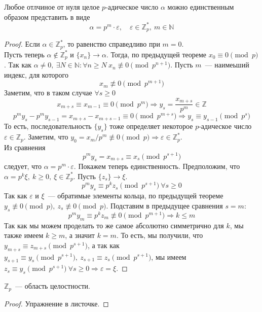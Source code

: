 \documentclass[11pt]{article}
\begin{document}
    \begin{theorem}\label{predstp-adic}
        Любое отлчиное от нуля целое $p$-адическое число $\alpha$ можно единственным образом представить в виде
        \[ \alpha = p^m \cdot \varepsilon, \quad \varepsilon \in \mathbb{Z}_p^{*}, \ m \in \mathbb{N} \]

    \end{theorem}
    \begin{proof}
        Если $\alpha \in \mathbb{Z}_p^{*}$, то равенство справедливо при $m = 0$.\\
        Пусть теперь $\alpha \notin \mathbb{Z}_p^{*}$ и $\{ x_n \} \to \alpha$. Тогда, по предыдущей теореме
        $x_0 \equiv 0 \pmod{p}$. Так как $\alpha \neq 0, \ \exists N \in \mathbb{N}\colon \forall n \ge N \ x_n \not\equiv 0 \pmod{p^{n + 1}}$.
        Пусть $m$~--- наимеьший индекс, для которого
        \[ x_m \not\equiv 0 \pmod{p^{m + 1}}\]
        Заметим, что в таком случае $\forall s \ge 0$
        \[ x_{m + s} \equiv x_{m - 1} \equiv 0 \pmod{p^{m}} \Rightarrow y_s = \frac{x_{m + s}}{p^m} \in \mathbb{Z} \]
        \[ p^m y_s - p^m y_{s - 1}  = x_{m + s} - x_{m + s - 1} \equiv 0 \pmod{p^{m + s}} \Rightarrow y_s \equiv y_{s - 1} \pmod{p^s}\]
        То есть, последовательность $\{ y_s \}$ тоже определяет некоторое $p$-адическое число $\varepsilon \in \mathbb{Z}_p$.
        Заметим, что $y_0 = x_m/p^m \not\equiv 0 \pmod{p} \Rightarrow \varepsilon \in \mathbb{Z}_p^{*}$.\\
        Из сравнения
        \[ p^m y_s = x_{m + s} \equiv x_s \pmod{p^{s + 1}} \]
        следует, что $\alpha = p^m \cdot \varepsilon$.
        Покажем теперь единственность. Предположим, что $\alpha = p^k \xi, \ k \ge 0, \ \xi \in \mathbb{Z}_{p}^{*}$. Пусть $\{ z_s \} \to \xi$.
        \[ p^m y_s \equiv p^k z_s \pmod{p^{s + 1}} \ \forall s \ge 0 \]
        Так как $\varepsilon$ и $\xi$~--- обратимые элементы кольца, по предыдущей теореме $y_s \not\equiv 0 \pmod{p}, \ z_s \not\equiv 0 \pmod{p}$.
        Подставим в предыдущее сравнения $s = m$:
        \[ p^m y_m \equiv p^k z_m \not\equiv 0 \pmod{p^{m + 1}} \Rightarrow k \le m \]
        Так как мы можем проделать то же самое абсолютно симметрично для $k$, мы также имеем $k \ge m$, а значит
        $k = m$.
        То есть, мы получили, что $y_{m + s} \equiv z_{m + s} \pmod{p^{s + 1}}$, а так как $y_{s + 1} \equiv y_s \pmod{p^{s + 1}}, \ z_{s + 1} \equiv z_s \pmod{p^{s + 1}}$,
        мы имеем $z_s \equiv y_s \pmod{p^{s + 1}} \ \forall s \ge 0 \Rightarrow \varepsilon = \xi$.
    \end{proof}
    \begin{corollary}
        $\mathbb{Z}_p$~--- область целостности.
     \end{corollary}
    \begin{proof}
        Упражнение в листочке.
    \end{proof}
\end{document}
